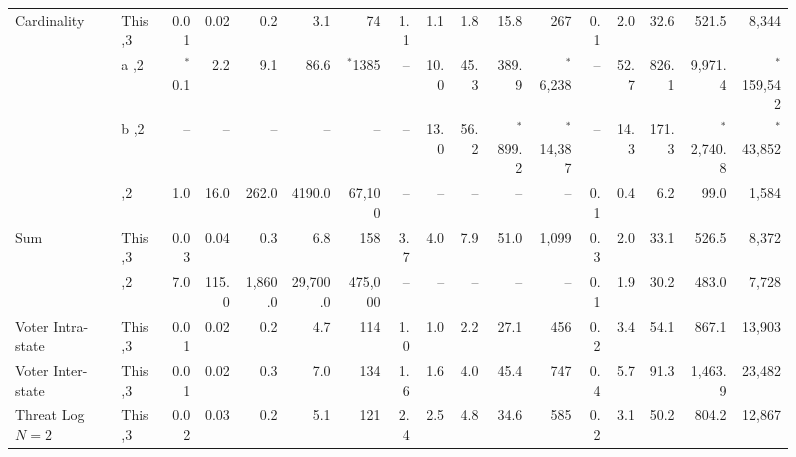 \documentclass[11pt,letterpaper]{article}
\begin{document}
\begin{figure*}[t!]
\begin{tabular}{|l |l|| r | r |r |r|r||r | r |r |r|r||r|r|r|r|r|}
	\multirow{3}{*}{Cardinality}  & This                          \hfill ,3      & 0.01    & 0.02     & 0.2      & 3.1         &         74 &   1.1 & 1.1      & 1.8      & 15.8      &        267 &   0.1 &      2.0 &     32.6 &       521.5 &       8,344 \\ \cline{2-17}
	                              & \cite{PSWW18}a                     \hfill ,2 & $^*$0.1 & 2.2      & 9.1      & 86.6        &   $^*$1385 &    -- & 10.0     & 45.3     & 389.9     &  $^*$6,238 &    -- &     52.7 &    826.1 &     9,971.4 & $^*$159,542 \\ \cline{2-17}
	                              & \cite{PSWW18}b                      \hfill,2 & --      & --       & --       & --          &         -- &    -- & 13.0     & 56.2     & $^*$899.2 & $^*$14,387 &    -- &     14.3 &    171.3 & $^*$2,740.8 &  $^*$43,852 \\ \cline{2-17}
	                              & \cite{DBLP:conf/cans/CristofaroGT12}\hfill,2 & 1.0     & 16.0     & 262.0    & 4190.0      &     67,100 &    -- & --       & --       & --        &           -- &   0.1 &      0.4 &      6.2 &        99.0 &       1,584 \\ \hline\hline
	\multirow{2}{*}{Sum}          & This                           \hfill ,3     & 0.03    & 0.04     & 0.3      & 6.8         &        158 &   3.7 & 4.0      & 7.9      & 51.0      &      1,099 &   0.3 &      2.0 &     33.1 &       526.5 &       8,372 \\ \cline{2-17}
	                              & \cite{cryptoeprint:2017:738}    \hfill ,2    & 7.0     & 115.0    & 1,860.0  & 29,700.0    &    475,000 &    -- & --       & --       & --        &           -- &   0.1 &      1.9 &     30.2 &       483.0 &       7,728 \\ \hline
	Voter Intra-state             & This                          \hfill ,3      & 0.01    & 0.02     & 0.2      & 4.7         &        114 &   1.0 & 1.0      & 2.2      & 27.1      &        456 &   0.2 &      3.4 &     54.1 &       867.1 &      13,903 \\ \hline
	Voter Inter-state             & This                         \hfill ,3       & 0.01    & 0.02     & 0.3      & 7.0         &        134 &   1.6 & 1.6      & 4.0      & 45.4      &        747 &   0.4 &      5.7 &     91.3 &     1,463.9 &      23,482 \\ \hline
	Threat Log $N=2$              & This                         \hfill ,3       & 0.02    & 0.03     & 0.2      & 5.1         &        121 &   2.4 & 2.5      & 4.8      & 34.6      &        585 &   0.2 &      3.1 &     50.2 &       804.2 &      12,867 \\ \hline

\end{tabular}
\end{figure*}
\end{document}
